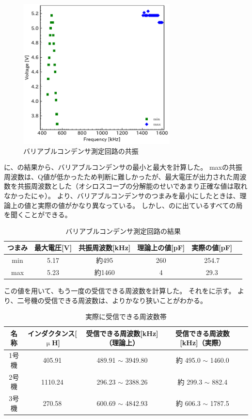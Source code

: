 \documentclass[report.tex]{subfiles}
\begin{document}
\begin{figure}[H]
	\centering
	\includegraphics[width=8cm]{fig/min_max.pdf}
	\caption{バリアブルコンデンサ測定回路の共振}
	\label{fig:inda4}
\end{figure}

に、の結果から、バリアブルコンデンサの最小と最大を計算した。
maxの共振周波数は、Q値が低かったため判断に難しかったが、最大電圧が出力された周波数を共振周波数とした（オシロスコープの分解能のせいであまり正確な値は取れなかったにゃ）。 %
より、バリアブルコンデンサのつまみを最小にしたときは、理論上の値と実際の値がかなり異なっている。
しかし、のに出ているすべての局を聞くことができる。

\begin{table}[H]
	\centering
	\caption{バリアブルコンデンサ測定回路の結果}
	\label{tab:ant3}
	\begin{tabular}{cccccc} \hline
		つまみ & 最大電圧[V] & 共振周波数[kHz] & 理論上の値[pF] & 実際の値[pF] \\ \hline
		min & 5.17    & 約495       & 260       & 254.7    \\
		max & 5.23    & 約1460      & 4         & 29.3     \\ \hline
	\end{tabular}
\end{table}

この値を用いて、もう一度の受信できる周波数を計算した。
それをに示す。
より、二号機の受信できる周波数は、よりかなり狭いことがわかる。

\begin{table}[H]
	\centering
	\caption{実際に受信できる周波数帯}
	\label{tab:ant5}
	\begin{tabular}{ccccc} \hline
		名称  & インダクタンス[\(\upmu\)H] & 受信できる周波数[kHz]（理論上）      & 受信できる周波数[kHz]（実際）       \\ \hline
		1号機 & 405.91              & 489.91 \(\sim\) 3949.80 & 約 495.0 \(\sim\) 1460.0 \\
		2号機 & 1110.24             & 296.23 \(\sim\) 2388.26 & 約 299.3 \(\sim\) 882.4  \\
		3号機 & 270.58              & 600.69 \(\sim\) 4842.93 & 約 606.3 \(\sim\) 1787.5 \\ \hline
	\end{tabular}
\end{table}
\end{document}

